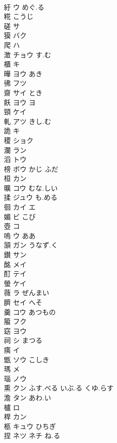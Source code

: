 \documentclass[8pt]{extreport}
\begin{document}
\begin{CJK}{UTF8}{min}
\\	紆	ウ めぐ.る			
\\	糀	こうじ			
\\	磋	サ			
\\	獏	バク			
\\	爬	ハ			
\\	澂	チョウ す.む					
\\	櫃	キ			
\\	曄	ヨウ あき			
\\	彿	フツ			
\\	齋	サイ とき			
\\	飫	ヨウ ヨ			
\\	頸	ケイ			
\\	軋	アツ きし.む			
\\	詭	キ			
\\	稷	ショク			
\\	瀾	ラン			
\\	滔	トウ			
\\	榜	ボウ かじ ふだ			
\\	桓	カン			
\\	曠	コウ むな.しい			
\\	揉	ジュウ も.める			
\\	徊	カイ エ			
\\	媚	ビ こび			
\\	壺	コ			
\\	嗚	ウ ああ			
\\	頷	ガン うなず.く			
\\	鑚	サン			
\\	酩	メイ			
\\	酊	テイ			
\\	螢	ケイ			
\\	薇	ラ ぜんまい			
\\	臍	セイ へそ			
\\	羹	コウ あつもの			
\\	箙	フク			
\\	窈	ヨウ			
\\	祠	シ まつる			
\\	痍	イ			
\\	甑	ソウ こしき			
\\	瑪	メ			
\\	瑙	ノウ			
\\	熏	クン ふす.べる いぶ.る くゆ.らす					
\\	澹	タン あわ.い			
\\	櫨	ロ			
\\	桿	カン			
\\	柩	キュウ ひちぎ			
\\	捏	ネツ ネチ ね.る			

\end{CJK}
\end{document}

